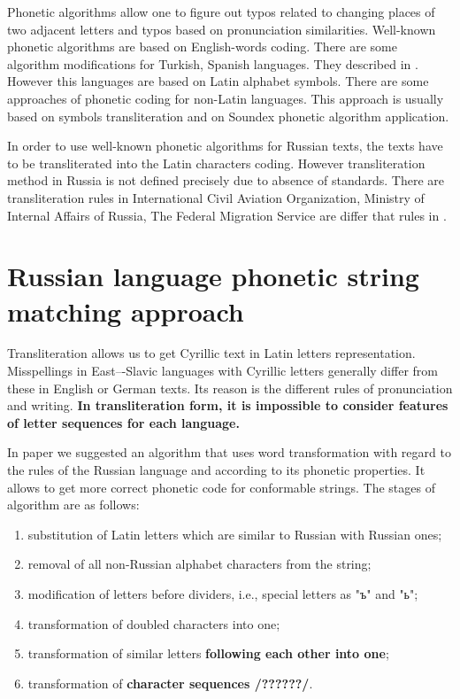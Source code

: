 \documentclass{svproc}
\begin{document}
Phonetic algorithms allow one to figure out typos related to changing places of two adjacent letters and typos based on pronunciation similarities. Well-known phonetic algorithms are based on English-words coding. There are some algorithm modifications for Turkish, Spanish languages. They described in \cite{Alotaibi-2013}. However this languages are based on Latin alphabet symbols. There are some approaches of phonetic coding for non-Latin languages. This approach is usually based on symbols transliteration and on Soundex phonetic algorithm \cite{Soundex} application.

In order to use well-known phonetic algorithms for Russian texts, the texts have to be transliterated into the Latin characters coding. However transliteration method in Russia is not defined precisely due to absence of standards. There are  transliteration rules in International Civil Aviation Organization, Ministry of Internal Affairs of Russia, The Federal Migration Service are differ that rules in \cite{GOST-2006}.

\section{Russian language phonetic string matching approach}
Transliteration allows us to get Cyrillic text in Latin letters representation. Misspellings in East–-Slavic languages with Cyrillic letters generally differ from these in English or German texts. Its reason is the different rules of pronunciation and writing. \textbf{In transliteration form, it is impossible to consider features of letter sequences for each language.}

In paper \cite{Paramonov-2016} we suggested an algorithm that uses word transformation with regard to the rules of the Russian language and according to its phonetic properties. It allows to get more correct phonetic code for conformable strings. The stages of algorithm are as follows:

\begin{enumerate}
\item substitution of Latin letters which are similar to Russian with Russian ones;
\item removal of all non-Russian alphabet characters from the string;
\item modification of letters before dividers, i.e., special letters as "ъ" and "ь";
\item transformation of doubled characters into one;
\item transformation of similar letters \textbf{following each other into one};
\item transformation of \textbf{character sequences /??????/}.
\end{enumerate}
\end{document}
